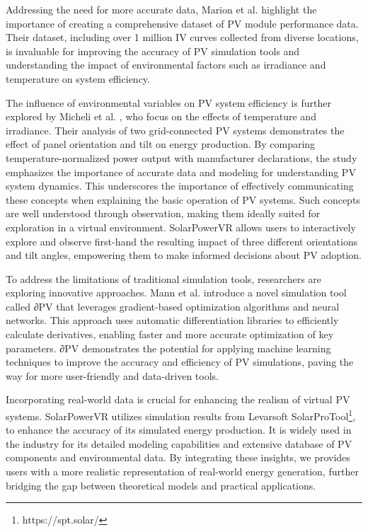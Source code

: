 \documentclass[draft, final]{vutinfth} %
\begin{document}
Addressing the need for more accurate data, Marion et al. \cite{Marion2014PvData} highlight the importance of creating a comprehensive dataset of PV module performance data. Their dataset, including over 1 million IV curves collected from diverse locations, is invaluable for improving the accuracy of PV simulation tools and understanding the impact of environmental factors such as irradiance and temperature on system efficiency. 

The influence of environmental variables on PV system efficiency is further explored by Micheli et al. \cite{Micheli2014OutdoorPerformance}, who focus on the effects of temperature and irradiance. Their analysis of two grid-connected PV systems demonstrates the effect of panel orientation and tilt on energy production. By comparing temperature-normalized power output with manufacturer declarations, the study emphasizes the importance of accurate data and modeling for understanding PV system dynamics. This underscores the importance of effectively communicating these concepts when explaining the basic operation of PV systems. Such concepts are well understood through observation, making them ideally suited for exploration in a virtual environment. SolarPowerVR allows users to interactively explore and observe first-hand the resulting impact of three different orientations and tilt angles, empowering them to make informed decisions about PV adoption.

To address the limitations of traditional simulation tools, researchers are exploring innovative approaches. Mann et al. \cite{Mann2022deltaPV} introduce a novel simulation tool called ∂PV that leverages gradient-based optimization algorithms and neural networks. This approach uses automatic differentiation libraries to efficiently calculate derivatives, enabling faster and more accurate optimization of key parameters. ∂PV demonstrates the potential for applying machine learning techniques to improve the accuracy and efficiency of PV simulations, paving the way for more user-friendly and data-driven tools.


Incorporating real-world data is crucial for enhancing the realism of virtual PV systems. SolarPowerVR utilizes simulation results from Levarsoft SolarProTool\footnote{https://spt.solar/}, to enhance the accuracy of its simulated energy production. It is widely used in the industry for its detailed modeling capabilities and extensive database of PV components and environmental data. By integrating these insights, we provides users with a more realistic representation of real-world energy generation, further bridging the gap between theoretical models and practical applications.
\end{document}
